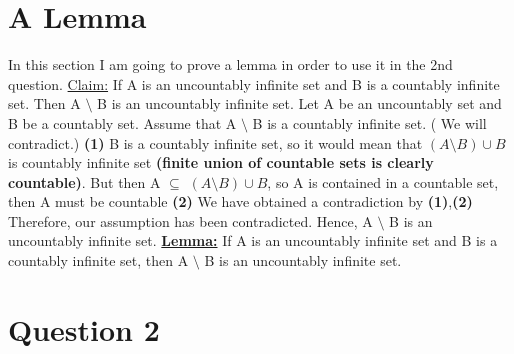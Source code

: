 \documentclass[11pt]{article}
\begin{document}
\newpage
\section*{A Lemma}
In this section I am going to prove a lemma in order to use it in the 2nd question.
\newline \newline
\noindent
\underline{Claim:} If A is an uncountably infinite set and B is a countably infinite set.
Then A $\setminus$ B is an uncountably infinite set.
\newline \newline
Let A be an uncountably set and B be a countably set.
\newline \newline
Assume that A $\setminus$ B is a countably infinite set. ( We will contradict.) \textbf{(1)}
\newline \newline
B is a countably infinite set, so it would mean that $(A \setminus B) \cup B$ is countably infinite set \textbf{(finite union of countable sets is clearly countable)}. But then A $\subseteq$ $(A \setminus B) \cup B$, so A is contained in a countable set, then A must be countable \textbf{(2)}
\newline\newline
We have obtained a contradiction by \textbf{(1)},\textbf{(2)}
\newline\newline
Therefore, our assumption has been contradicted. Hence, A $\setminus$ B is an uncountably infinite set.
\newline\newline\newline\newline
\noindent
\textbf{\underline{Lemma:}} If A is an uncountably infinite set and B is a countably infinite set, then A $\setminus$ B is an uncountably infinite set.


\newpage
\section*{Question 2}
\end{document}
